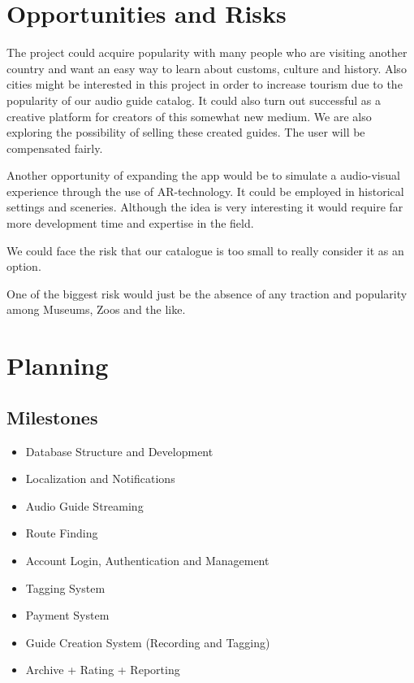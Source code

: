 \documentclass[12pt]{article}
\theoremstyle{definition}
\newenvironment{text}{
}{}
\begin{document}
\pagebreak
\section{Opportunities and Risks}
\begin{text}
The project could acquire popularity with many people who are visiting another country and want an easy way to learn about customs, culture and history.
Also cities might be interested in this project in order to increase tourism due to the popularity of our audio guide catalog.
It could also turn out successful as a creative platform for creators of this somewhat new medium. We are also exploring the possibility of selling these created guides. The user will be compensated fairly.\newline
 
Another opportunity of expanding the app would be to simulate a audio-visual experience through the use of AR-technology. It could be employed in historical settings and sceneries. Although the idea is very interesting it would require far more development time and expertise in the field.\newline
 
We could face the risk that our catalogue is too small to really consider it as an option.\newline 
 
One of the biggest risk would just be the absence of any traction and popularity among Museums, Zoos and the like. \newline
 
\end{text}
 
\pagebreak
\section{Planning}
\subsection{Milestones}
\begin{itemize}
\item Database Structure and Development
\item Localization and Notifications
\item Audio Guide Streaming
\item Route Finding
\item Account Login, Authentication and Management
\item Tagging System
\item Payment System
\item Guide Creation System (Recording and Tagging)
\item Archive + Rating + Reporting
\end{itemize}
\end{document}
